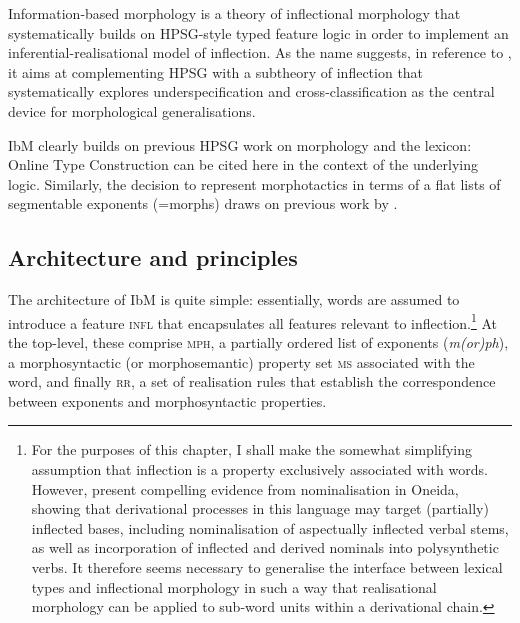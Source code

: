 \documentclass[output=paper,biblatex,babelshorthands,newtxmath,draftmode,colorlinks,citecolor=brown]{langscibook}
\begin{document}
\begin{exe}
\begin{xlist}
Information-based morphology \citep{Crysmann:Bonami:2016} is a theory
of inflectional morphology that systematically builds on HPSG-style
typed feature logic in order to implement an inferential-realisational
model of inflection. As the name suggests, in reference to
\citet{Pollard87}, it aims at complementing HPSG with a 
subtheory of inflection that systematically 
explores underspecification and cross-classification as the central
device for morphological generalisations.

IbM clearly builds on previous HPSG work on morphology and the
lexicon: Online Type Construction \citep{Koenig94} can be cited here
in the context of the underlying logic. Similarly, the decision to
represent morphotactics in terms of a flat lists of segmentable
exponents (=morphs) draws on previous work by
\citet{crysmann_b03book}. 


\subsection{Architecture and principles}

The architecture of IbM is quite simple: essentially, words are
assumed to introduce a feature \textsc{infl} that encapsulates all
features relevant to inflection.\footnote{For the purposes of this
  chapter, I shall make the somewhat simplifying assumption that
  inflection is a property exclusively associated with words. However,
  \citet{Koenig:Michelson:2020} present compelling evidence from
  nominalisation in Oneida, showing that derivational processes in
  this language may target (partially) inflected bases, including
  nominalisation of aspectually inflected verbal stems, as well as
  incorporation of inflected and derived nominals into polysynthetic
  verbs. It therefore seems necessary to generalise the interface
  between lexical types and inflectional morphology in such a way that
realisational morphology can be applied to sub-word units within a
derivational chain. } At the top-level, these comprise \textsc{mph},\label{morphology:page-mph-feature} a partially
ordered list of exponents (\textit{m(or)ph}), a morphosyntactic (or
morphosemantic) property set \textsc{ms} associated with the word, and
finally \textsc{rr}, a set of realisation rules that establish the
correspondence between exponents and morphosyntactic properties.

\begin{exe}
  \ex
{}


\end{exe}
\end{xlist}
\end{exe}
\end{document}
